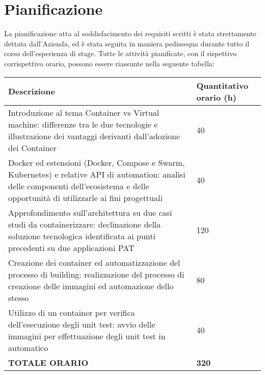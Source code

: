 \section{Pianificazione}
La pianificazione atta al soddisfacimento dei requisiti scritti è stata strettamente dettata dall'Azienda, ed è stata seguita in maniera pedissequa durante tutto il corso dell'esperienza di stage.
Tutte le attività pianificate, con il rispettivo corrispettivo orario, possono essere riassunte nella seguente tabella:
\begin{center}
\begin{tabular}{|m{30em} | m{}|} 
 \hline
 Descrizione & Quantitativo orario (h)\\ [0.5ex] 
 \hline\hline
 Introduzione al tema Container vs Virtual machine: differenze tra le due tecnologie e
illustrazione dei vantaggi derivanti dall'adozione dei Container & 40 \\ 
 \hline
 Docker ed estensioni (Docker, Compose e Swarm, Kubernetes) e relative API di
automation: analisi delle componenti dell'ecosistema e delle opportunità di utilizzarle
ai fini progettuali & 40 \\
 \hline
 Approfondimento sull'architettura su due casi studi da containerizzare: declinazione
della soluzione tecnologica identificata ai punti precedenti su due applicazioni PAT & 120 \\
 \hline
 Creazione dei container ed automatizzazione del processo di building: realizzazione
del processo di creazione delle immagini ed automazione dello stesso & 80 \\
 \hline
 Utilizzo di un container per verifica dell'esecuzione degli unit test: avvio delle
immagini per effettuazione degli unit test in automatico & 40 \\ [1ex] 
 \hline
 \textbf{TOTALE ORARIO} & \textbf{320}\\
 \hline
\end{tabular}
\end{center}